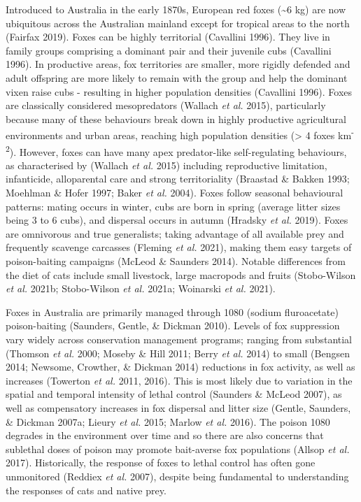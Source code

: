 \documentclass[11pt,a4paper,titlepage,twoside,openright]{style/unimelbthesis}
\begin{document}
\begin{mainmatter}
Introduced to Australia in the early 1870s, European red foxes (\textasciitilde6 kg) are now ubiquitous across the Australian mainland except for tropical areas to the north (Fairfax 2019). Foxes can be highly territorial (Cavallini 1996). They live in family groups comprising a dominant pair and their juvenile cubs (Cavallini 1996). In productive areas, fox territories are smaller, more rigidly defended and adult offspring are more likely to remain with the group and help the dominant vixen raise cubs - resulting in higher population densities (Cavallini 1996). Foxes are classically considered mesopredators (Wallach \emph{et al.} 2015), particularly because many of these behaviours break down in highly productive agricultural environments and urban areas, reaching high population densities (\textgreater{} 4 foxes km\textsuperscript{-2}). However, foxes can have many apex predator-like self-regulating behaviours, as characterised by (Wallach \emph{et al.} 2015) including reproductive limitation, infanticide, alloparental care and strong territoriality (Braastad \& Bakken 1993; Moehlman \& Hofer 1997; Baker \emph{et al.} 2004). Foxes follow seasonal behavioural patterns: mating occurs in winter, cubs are born in spring (average litter sizes being 3 to 6 cubs), and dispersal occurs in autumn (Hradsky \emph{et al.} 2019). Foxes are omnivorous and true generalists; taking advantage of all available prey and frequently scavenge carcasses (Fleming \emph{et al.} 2021), making them easy targets of poison-baiting campaigns (McLeod \& Saunders 2014). Notable differences from the diet of cats include small livestock, large macropods and fruits (Stobo-Wilson \emph{et al.} 2021b; Stobo-Wilson \emph{et al.} 2021a; Woinarski \emph{et al.} 2021).

Foxes in Australia are primarily managed through 1080 (sodium fluroacetate) poison-baiting (Saunders, Gentle, \& Dickman 2010). Levels of fox suppression vary widely across conservation management programs; ranging from substantial (Thomson \emph{et al.} 2000; Moseby \& Hill 2011; Berry \emph{et al.} 2014) to small (Bengsen 2014; Newsome, Crowther, \& Dickman 2014) reductions in fox activity, as well as increases (Towerton \emph{et al.} 2011, 2016). This is most likely due to variation in the spatial and temporal intensity of lethal control (Saunders \& McLeod 2007), as well as compensatory increases in fox dispersal and litter size (Gentle, Saunders, \& Dickman 2007a; Lieury \emph{et al.} 2015; Marlow \emph{et al.} 2016). The poison 1080 degrades in the environment over time and so there are also concerns that sublethal doses of poison may promote bait-averse fox populations (Allsop \emph{et al.} 2017). Historically, the response of foxes to lethal control has often gone unmonitored (Reddiex \emph{et al.} 2007), despite being fundamental to understanding the responses of cats and native prey.


\end{mainmatter}
\end{document}
